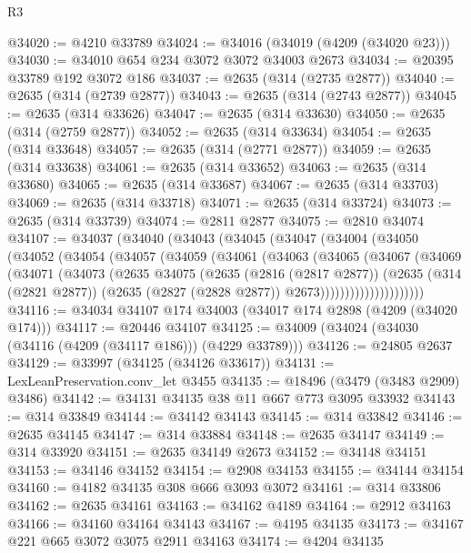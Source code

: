 \begin{lexlean}{R3}
\begin{coremodule}
@34020 := @4210 @33789
@34024 := @34016 (@34019 (@4209 (@34020 @23)))
@34030 := @34010 @654 @234 @3072 @3072 @34003 @2673
@34034 := @20395 @33789 @192 @3072 @186
@34037 := @2635 (@314 (@2735 @2877))
@34040 := @2635 (@314 (@2739 @2877))
@34043 := @2635 (@314 (@2743 @2877))
@34045 := @2635 (@314 @33626)
@34047 := @2635 (@314 @33630)
@34050 := @2635 (@314 (@2759 @2877))
@34052 := @2635 (@314 @33634)
@34054 := @2635 (@314 @33648)
@34057 := @2635 (@314 (@2771 @2877))
@34059 := @2635 (@314 @33638)
@34061 := @2635 (@314 @33652)
@34063 := @2635 (@314 @33680)
@34065 := @2635 (@314 @33687)
@34067 := @2635 (@314 @33703)
@34069 := @2635 (@314 @33718)
@34071 := @2635 (@314 @33724)
@34073 := @2635 (@314 @33739)
@34074 := @2811 @2877
@34075 := @2810 @34074
@34107 := @34037
    (@34040
      (@34043
        (@34045
          (@34047
            (@34004
              (@34050
                (@34052
                  (@34054
                    (@34057
                      (@34059
                        (@34061
                          (@34063
                            (@34065
                              (@34067
                                (@34069
                                  (@34071
                                    (@34073
                                      (@2635
                                        @34075
                                        (@2635
                                          (@2816 (@2817 @2877))
                                          (@2635
                                            (@314 (@2821 @2877))
                                            (@2635 (@2827 (@2828 @2877)) @2673)))))))))))))))))))))
@34116 := @34034 @34107 @174 @34003 (@34017 @174 @2898 (@4209 (@34020 @174)))
@34117 := @20446 @34107
@34125 := @34009 (@34024 (@34030 (@34116 (@4209 (@34117 @186))) (@4229 @33789)))
@34126 := @24805 @2637
@34129 := @33997 (@34125 (@34126 @33617))
@34131 := LexLeanPreservation.conv_let @3455
@34135 := @18496 (@3479 (@3483 @2909) @3486)
@34142 := @34131 @34135 @38 @11 @667 @773 @3095 @33932
@34143 := @314 @33849
@34144 := @34142 @34143
@34145 := @314 @33842
@34146 := @2635 @34145
@34147 := @314 @33884
@34148 := @2635 @34147
@34149 := @314 @33920
@34151 := @2635 @34149 @2673
@34152 := @34148 @34151
@34153 := @34146 @34152
@34154 := @2908 @34153
@34155 := @34144 @34154
@34160 := @4182 @34135 @308 @666 @3093 @3072
@34161 := @314 @33806
@34162 := @2635 @34161
@34163 := @34162 @4189
@34164 := @2912 @34163
@34166 := @34160 @34164 @34143
@34167 := @4195 @34135
@34173 := @34167 @221 @665 @3072 @3075 @2911 @34163
@34174 := @4204 @34135

\end{coremodule}
\end{lexlean}
